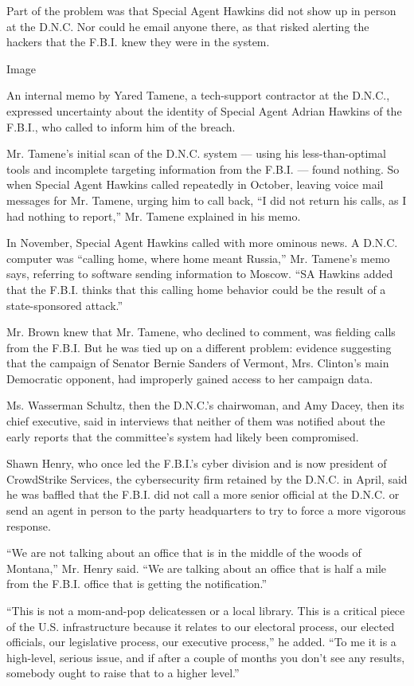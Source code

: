 Part of the problem was that Special Agent Hawkins did not show up in
person at the D.N.C. Nor could he email anyone there, as that risked
alerting the hackers that the F.B.I. knew they were in the system.

Image

An internal memo by Yared Tamene, a tech-support contractor at the
D.N.C., expressed uncertainty about the identity of Special Agent Adrian
Hawkins of the F.B.I., who called to inform him of the breach.

Mr. Tamene's initial scan of the D.N.C. system --- using his
less-than-optimal tools and incomplete targeting information from the
F.B.I. --- found nothing. So when Special Agent Hawkins called
repeatedly in October, leaving voice mail messages for Mr. Tamene,
urging him to call back, ``I did not return his calls, as I had nothing
to report,'' Mr. Tamene explained in his memo.

In November, Special Agent Hawkins called with more ominous news. A
D.N.C. computer was ``calling home, where home meant Russia,'' Mr.
Tamene's memo says, referring to software sending information to Moscow.
``SA Hawkins added that the F.B.I. thinks that this calling home
behavior could be the result of a state-sponsored attack.''

Mr. Brown knew that Mr. Tamene, who declined to comment, was fielding
calls from the F.B.I. But he was tied up on a different problem:
evidence suggesting that the campaign of Senator Bernie Sanders of
Vermont, Mrs. Clinton's main Democratic opponent, had improperly gained
access to her campaign data.

Ms. Wasserman Schultz, then the D.N.C.'s chairwoman, and Amy Dacey, then
its chief executive, said in interviews that neither of them was
notified about the early reports that the committee's system had likely
been compromised.

Shawn Henry, who once led the F.B.I.'s cyber division and is now
president of CrowdStrike Services, the cybersecurity firm retained by
the D.N.C. in April, said he was baffled that the F.B.I. did not call a
more senior official at the D.N.C. or send an agent in person to the
party headquarters to try to force a more vigorous response.

``We are not talking about an office that is in the middle of the woods
of Montana,'' Mr. Henry said. ``We are talking about an office that is
half a mile from the F.B.I. office that is getting the notification.''

``This is not a mom-and-pop delicatessen or a local library. This is a
critical piece of the U.S. infrastructure because it relates to our
electoral process, our elected officials, our legislative process, our
executive process,'' he added. ``To me it is a high-level, serious
issue, and if after a couple of months you don't see any results,
somebody ought to raise that to a higher level.''

